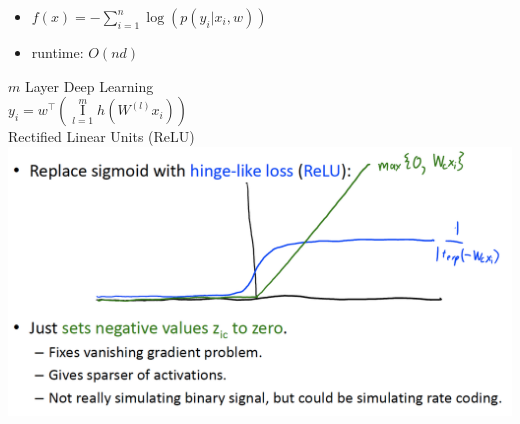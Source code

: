 \documentclass[10pt,landscape,a4paper]{article}
\DeclareMathOperator*{\composition}{I}
\begin{document}
\begin{multicols*}{5}
\begin{itemize}
    \item \(f(x) = - \sum_{i=1}^{n}\log{(p(y_i|x_i,w))}\)
    \item runtime: \(O(nd)\)
\end{itemize}
\(m\) Layer Deep Learning \\
$y_i = w^\intercal (\composition\limits_{l=1}^{m} h(W^{(l)} x_i))$ \\
Rectified Linear Units (ReLU) \\
\includegraphics[scale=0.15]{relu}


\end{multicols*}
\end{document}
